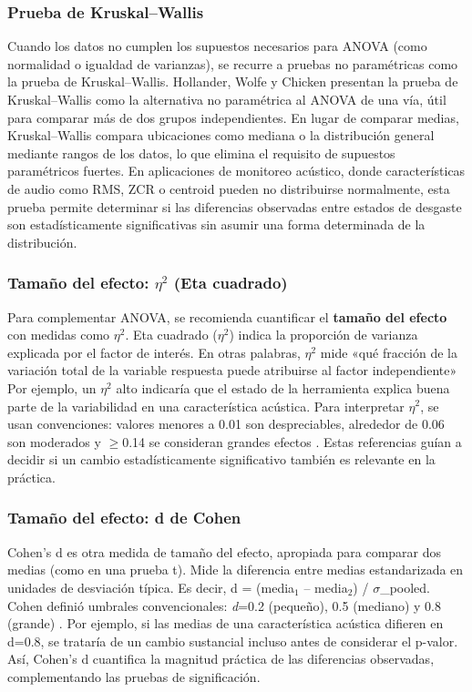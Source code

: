 \documentclass[12pt, letterpaper]{report}
\begin{document}
\subsubsection{Prueba de Kruskal--Wallis}

Cuando los datos no cumplen los supuestos necesarios para ANOVA (como normalidad o igualdad de varianzas), se recurre a pruebas no paramétricas como la prueba de Kruskal--Wallis. Hollander, Wolfe y Chicken  presentan la prueba de Kruskal--Wallis como la alternativa no paramétrica al ANOVA de una vía, útil para comparar más de dos grupos independientes. En lugar de comparar medias, Kruskal--Wallis compara ubicaciones como mediana o la distribución general mediante rangos de los datos, lo que elimina el requisito de supuestos paramétricos fuertes. En aplicaciones de monitoreo acústico, donde características de audio como RMS, ZCR o centroid pueden no distribuirse normalmente, esta prueba permite determinar si las diferencias observadas entre estados de desgaste son estadísticamente significativas sin asumir una forma determinada de la distribución.

\subsubsection{Tamaño del efecto: $\eta$$^2$ (Eta cuadrado)}

Para complementar ANOVA, se recomienda cuantificar el \textbf{tamaño del efecto} con medidas como $\eta$$^2$. Eta cuadrado ($\eta$$^2$) indica la proporción de varianza explicada por el factor de interés. En otras palabras, $\eta$$^2$ mide «qué fracción de la variación total de la variable respuesta puede atribuirse al factor independiente» Por ejemplo, un $\eta$$^2$ alto indicaría que el estado de la herramienta explica buena parte de la variabilidad en una característica acústica. Para interpretar $\eta$$^2$, se usan convenciones: valores menores a 0.01 son despreciables, alrededor de 0.06 son moderados y $\geq$0.14 se consideran grandes efectos . Estas referencias guían a decidir si un cambio estadísticamente significativo también es relevante en la práctica.

\subsubsection{Tamaño del efecto: d de Cohen}

Cohen’s d es otra medida de tamaño del efecto, apropiada para comparar dos medias (como en una prueba t). Mide la diferencia entre medias estandarizada en unidades de desviación típica. Es decir, d = (media$_1$ -- media$_2$) / $\sigma$\_pooled. Cohen definió umbrales convencionales: \textit{d}=0.2 (pequeño), 0.5 (mediano) y 0.8 (grande) . Por ejemplo, si las medias de una característica acústica difieren en d=0.8, se trataría de un cambio sustancial incluso antes de considerar el p-valor. Así, Cohen’s d cuantifica la magnitud práctica de las diferencias observadas, complementando las pruebas de significación. 
\end{document}
